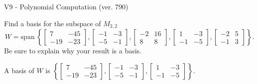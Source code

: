 \begin{exercise}
  \begin{exerciseTitle}V9 - Polynomial Computation (ver. 790)\end{exerciseTitle}
  \begin{exerciseStatement}
    Find a basis for the subspace of \(M_{2,2}\) 
\[W=\mathrm{span}\ \left\{\left[\begin{array}{cc}
7 & -45 \\
-19 & -23
\end{array}\right] , \left[\begin{array}{cc}
-1 & -3 \\
-5 & -1
\end{array}\right] , \left[\begin{array}{cc}
-2 & 16 \\
8 & 8
\end{array}\right] , \left[\begin{array}{cc}
1 & -3 \\
-1 & -5
\end{array}\right] , \left[\begin{array}{cc}
-2 & 5 \\
-1 & 3
\end{array}\right]\right\}.\]
 Be sure to explain why your result is a basis.


  \end{exerciseStatement}
  \begin{exerciseAnswer}
   A basis of \(W\) is  \(\left\{\left[\begin{array}{cc}
7 & -45 \\
-19 & -23
\end{array}\right] , \left[\begin{array}{cc}
-1 & -3 \\
-5 & -1
\end{array}\right] , \left[\begin{array}{cc}
1 & -3 \\
-1 & -5
\end{array}\right]\right\}\).
  


  \end{exerciseAnswer}
\end{exercise}
